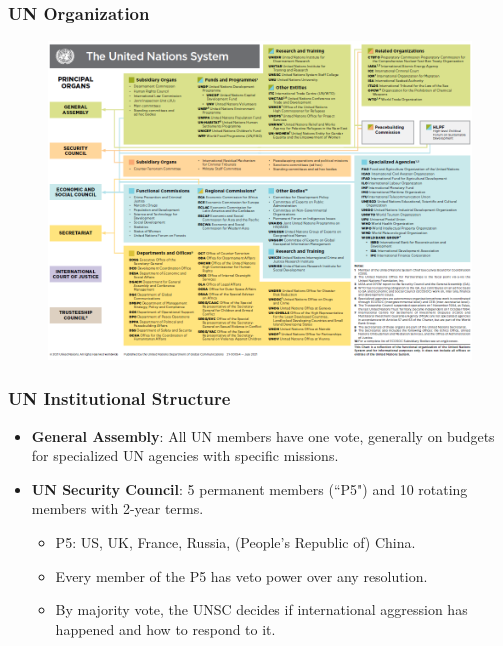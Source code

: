 \documentclass[handout]{beamer}
\begin{document}
\begin{frame} 
	\frametitle{\LARGE{UN Organization}}
	\begin{figure}[ht!]
		\centering
		\includegraphics[width=\textwidth,height=\textheight,keepaspectratio]{UNorg.png}
	\end{figure}
\end{frame}	

\begin{frame} 
	\frametitle{\LARGE{UN Institutional Structure}}
	\begin{itemize}
		\item \textbf{General Assembly}: All UN members have one vote, generally on budgets for specialized UN agencies with specific missions.
		\item \textbf{UN Security Council}: 5 permanent members (``P5") and 10 rotating members with 2-year terms.
		\begin{itemize}
			\item P5: US, UK, France, Russia, (People's Republic of) China. \pause
			\item Every member of the P5 has veto power over any resolution. \pause
			\item By majority vote, the UNSC decides if international aggression has happened and how to respond to it. 			
		\end{itemize}
	\end{itemize}
\end{frame}
\end{document}
